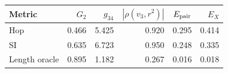 \begin{tabular}{lrrrrr}
\toprule
Metric & $G_2$ & $g_{34}$ & $|\rho(v_3,r^2)|$ & $E_{\rm pair}$ & $E_X$ \\
\midrule
Hop & 0.466 & 5.425 & 0.920 & 0.295 & 0.414 \\
SI & 0.635 & 6.723 & 0.950 & 0.248 & 0.335 \\
Length oracle & 0.895 & 1.182 & 0.267 & 0.016 & 0.018 \\
\bottomrule
\end{tabular}
